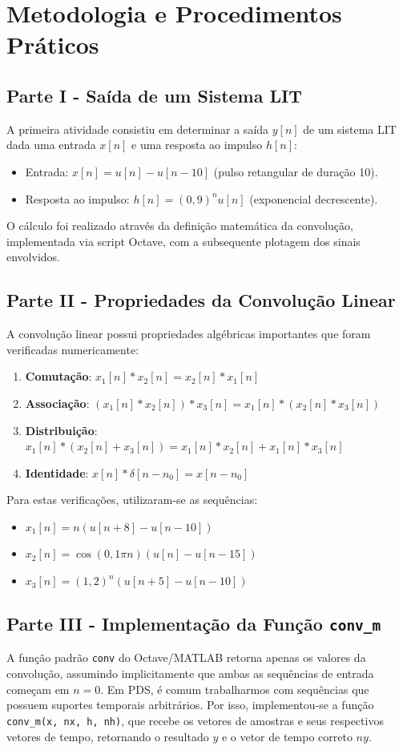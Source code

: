 \documentclass[tcc]{classe_uftex/uftex}
\begin{document}
\chapter{Metodologia e Procedimentos Práticos}

\section{Parte I - Saída de um Sistema LIT}
A primeira atividade consistiu em determinar a saída $y[n]$ de um sistema LIT dada uma entrada $x[n]$ e uma resposta ao impulso $h[n]$:
\begin{itemize}
    \item Entrada: $x[n] = u[n] - u[n-10]$ (pulso retangular de duração 10).
    \item Resposta ao impulso: $h[n] = (0,9)^n u[n]$ (exponencial decrescente).
\end{itemize}
O cálculo foi realizado através da definição matemática da convolução, implementada via script Octave, com a subsequente plotagem dos sinais envolvidos.

\section{Parte II - Propriedades da Convolução Linear}
A convolução linear possui propriedades algébricas importantes que foram verificadas numericamente:
\begin{enumerate}
    \item \textbf{Comutação}: $x_1[n] * x_2[n] = x_2[n] * x_1[n]$
    \item \textbf{Associação}: $(x_1[n] * x_2[n]) * x_3[n] = x_1[n] * (x_2[n] * x_3[n])$
    \item \textbf{Distribuição}: $x_1[n] * (x_2[n] + x_3[n]) = x_1[n] * x_2[n] + x_1[n] * x_3[n]$
    \item \textbf{Identidade}: $x[n] * \delta[n - n_0] = x[n - n_0]$
\end{enumerate}

Para estas verificações, utilizaram-se as sequências:
\begin{itemize}
    \item $x_1[n] = n(u[n+8] - u[n-10])$
    \item $x_2[n] = \cos(0,1\pi n)(u[n] - u[n-15])$
    \item $x_3[n] = (1,2)^n(u[n+5] - u[n-10])$
\end{itemize}

\section{Parte III - Implementação da Função \texttt{conv\_m}}
A função padrão \texttt{conv} do Octave/MATLAB retorna apenas os valores da convolução, assumindo implicitamente que ambas as sequências de entrada começam em $n=0$. Em PDS, é comum trabalharmos com sequências que possuem suportes temporais arbitrários. Por isso, implementou-se a função \texttt{conv\_m(x, nx, h, nh)}, que recebe os vetores de amostras e seus respectivos vetores de tempo, retornando o resultado $y$ e o vetor de tempo correto $ny$.
\end{document}
